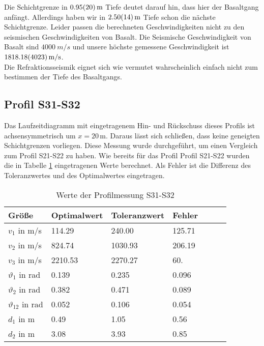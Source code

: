 Die Schichtgrenze in $\SI{0.95 \pm 0.20}{m}$  Tiefe deutet darauf hin, dass hier der Basaltgang anfängt. Allerdings haben wir in $\SI{2.50 \pm 0.14}{m}$ Tiefe schon die nächste Schichtgrenze. Leider passen die berechneten Geschwindigkeiten nicht zu den seismischen Geschwindigkeiten von Basalt. Die Seismische Geschwindigkeit von Basalt sind $\SI{4000}{m/s}$ und unsere höchste gemessene Geschwindigkeit ist $\SI{1818.18 \pm 40.23}{m/s}$.\\
Die Refraktionsseismik eignet sich wie vermutet wahrscheinlich einfach nicht zum bestimmen der Tiefe des Basaltgangs. 


\subsection{Profil S31-S32}

Das Laufzeitdiagramm mit eingetragenem Hin- und Rückschuss dieses Profils ist achsensymmetrisch um $x=20$\,m. Daraus lässt sich schließen, dass keine geneigten Schichtgrenzen vorliegen.
Diese Messung wurde durchgeführt, um einen Vergleich zum Profil S21-S22 zu haben.
Wie bereits für das Profil Profil S21-S22 wurden die in Tabelle \ref{tab:S31-S32} eingetragenen Werte berechnet. Als Fehler ist die Differenz des Toleranzwertes und des Optimalwertes eingetragen.\\



\begin{table}[!ht]
\centering
\caption{Werte der Profilmessung S31-S32}
\label{tab:S31-S32}
\begin{tabular}{lllllll}
\toprule
Größe   & Optimalwert   & Toleranzwert   & Fehler \\
\midrule
$v_1$ in m/s & 114.29 & 240.00 &  125.71\\
$v_2$ in m/s & 824.74 & 1030.93 & 206.19 \\
$v_3$ in m/s & 2210.53 & 2270.27 & 60. \\
$\vartheta_1$ in rad & 0.139 & 0.235 & 0.096  \\
$\vartheta_2$ in rad & 0.382 & 0.471 & 0.089 \\
$\vartheta_{12}$ in rad & 0.052 & 0.106 & 0.054 \\
$d_1$ in m & 0.49 & 1.05 & 0.56 \\
$d_2$ in m & 3.08 & 3.93 & 0.85 \\

\bottomrule
\end{tabular}
\end{table}

